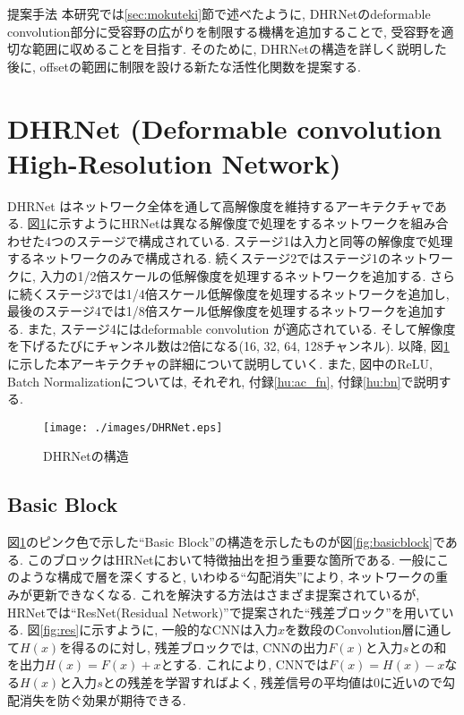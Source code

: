 \begin{chapter}{提案手法}\label{chap:teian}
本研究では\ref{sec:mokuteki}節で述べたように, DHRNetのdeformable convolution部分に受容野の広がりを制限する機構を追加することで, 受容野を適切な範囲に収めることを目指す. そのために, DHRNetの構造を詳しく説明した後に, offsetの範囲に制限を設ける新たな活性化関数を提案する. 

\section{DHRNet (Deformable convolution High-Resolution Network)}\label{sub:dhrnet}
DHRNet はネットワーク全体を通して高解像度を維持するアーキテクチャである. 図\ref{fig:hrnet_zentai}に示すようにHRNetは異なる解像度で処理をするネットワークを組み合わせた4つのステージで構成されている. ステージ1は入力と同等の解像度で処理するネットワークのみで構成される. 続くステージ2ではステージ1のネットワークに, 入力の1/2倍スケールの低解像度を処理するネットワークを追加する. さらに続くステージ3では1/4倍スケール低解像度を処理するネットワークを追加し, 最後のステージ4では1/8倍スケール低解像度を処理するネットワークを追加する. また, ステージ4にはdeformable convolution が適応されている. そして解像度を下げるたびにチャンネル数は2倍になる(16, 32, 64, 128チャンネル). 以降, 図\ref{fig:hrnet_zentai}に示した本アーキテクチャの詳細について説明していく. また, 図中のReLU, Batch Normalizationについては, それぞれ, 付録\ref{hu:ac_fn}, 付録\ref{hu:bn}で説明する. 
\begin{figure}[h]
  \centering
  \texttt{[image: ./images/DHRNet.eps]}
  \caption{DHRNetの構造}
  \label{fig:hrnet_zentai}
\end{figure}
\newpage
\subsection{Basic Block}\label{subsec:BB}
図\ref{fig:hrnet_zentai}のピンク色で示した``Basic Block''の構造を示したものが図\ref{fig:basicblock}である. このブロックはHRNetにおいて特徴抽出を担う重要な箇所である. 一般にこのような構成で層を深くすると, いわゆる``勾配消失''により, ネットワークの重みが更新できなくなる. これを解決する方法はさまざま提案されているが, HRNetでは``ResNet(Residual Network)''\cite{resnet}で提案された``残差ブロック''を用いている. 図\ref{fig:res}に示すように, 一般的なCNNは入力$x$を数段のConvolution層に通して$H(x)$を得るのに対し, 残差ブロックでは, CNNの出力$F(x)$と入力$s$との和を出力$H(x)=F(x)+x$とする. これにより, CNNでは$F(x)=H(x)-x$なる$H(x)$と入力$s$との残差を学習すればよく, 残差信号の平均値は0に近いので勾配消失を防ぐ効果が期待できる.


\end{chapter}
